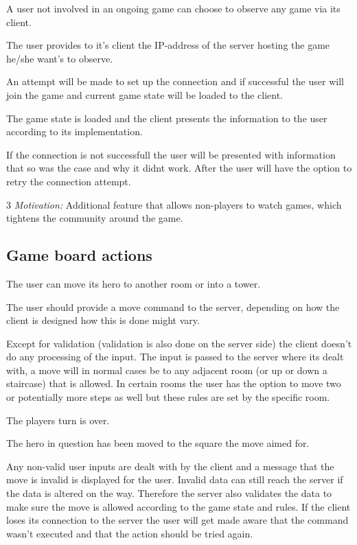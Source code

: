 A user not involved in an ongoing game can choose to observe any game via its client. 

The user provides to it's client the IP-address of the server hosting the game he/she want's to observe.

An attempt will be made to set up the connection and if successful the user will join the game and current game state will be loaded to the client.

The game state is loaded and the client presents the information to the user according to its implementation.

If the connection is not successfull the user will be presented with information that so was the case and why it didnt work. After the user will have the option to retry the connection attempt. 

3 \emph{Motivation:} Additional feature that allows non-players to watch games, which tightens the community around the game.

\stoprequirement

\subsection{Game board actions}


The user can move its hero to another room or into a tower.

The user should provide a move command to the server, depending on how the client is designed how this is done might vary.

Except for validation (validation is also done on the server side) the client doesn't do any processing of the input. The input is passed to the server where its dealt with, a move will in normal cases be to any adjacent room (or up or down a staircase) that is allowed. In certain rooms the user has the option to move two or potentially more steps as well but these rules are set by the specific room.

The players turn is over.

The hero in question has been moved to the square the move aimed for.

Any non-valid user inputs are dealt with by the client and a message that the move is invalid is displayed for the user.
Invalid data can still reach the server if the data is altered on the way. Therefore the server also validates the data to make sure the move is allowed according to the game state and rules.
If the client loses its connection to the server the user will get made aware that the command wasn't executed and that the action should be tried again.

